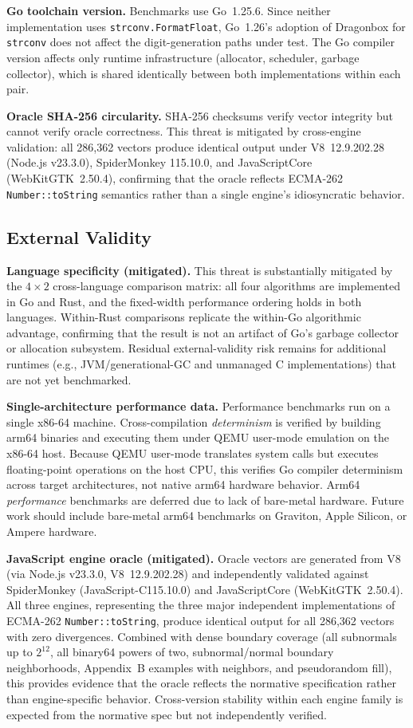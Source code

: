 \textbf{Go toolchain version.}
Benchmarks use Go~1.25.6.  Since neither implementation uses
\texttt{strconv.FormatFloat}, Go~1.26's adoption of Dragonbox for
\texttt{strconv} does not affect the digit-generation paths under test.
The Go compiler version affects only runtime infrastructure (allocator,
scheduler, garbage collector), which is shared identically between
both implementations within each pair.

\textbf{Oracle SHA-256 circularity.}
SHA-256 checksums verify vector integrity but cannot verify oracle
correctness.  This threat is mitigated by cross-engine validation:
all 286{,}362 vectors produce identical output under V8~12.9.202.28
(Node.js v23.3.0), SpiderMonkey 115.10.0, and JavaScriptCore
(WebKitGTK~2.50.4), confirming that the oracle reflects ECMA-262
\texttt{Number::toString} semantics rather than a single engine's
idiosyncratic behavior.

\subsection{External Validity}

\textbf{Language specificity (mitigated).}
This threat is substantially mitigated by the $4 \times 2$
cross-language comparison matrix: all four algorithms are implemented in
Go and Rust, and the fixed-width performance ordering holds in both
languages.  Within-Rust
comparisons replicate the within-Go algorithmic advantage, confirming
that the result is not an artifact of Go's garbage collector or
allocation subsystem.  Residual external-validity risk remains for
additional runtimes (e.g., JVM/generational-GC and unmanaged C
implementations) that are not yet benchmarked.

\textbf{Single-architecture performance data.}
Performance benchmarks run on a single x86-64 machine.
Cross-compilation \emph{determinism} is verified by building arm64
binaries and executing them under QEMU user-mode emulation on the x86-64
host.  Because QEMU user-mode translates system calls but executes
floating-point operations on the host CPU, this verifies Go compiler
determinism across target architectures, not native arm64 hardware
behavior.  Arm64 \emph{performance} benchmarks are deferred due to lack
of bare-metal hardware.  Future work should include bare-metal arm64
benchmarks on Graviton, Apple Silicon, or Ampere hardware.

\textbf{JavaScript engine oracle (mitigated).}
Oracle vectors are generated from V8 (via Node.js v23.3.0,
V8~12.9.202.28) and independently validated against SpiderMonkey
(JavaScript-C115.10.0) and JavaScriptCore (WebKitGTK~2.50.4).  All
three engines, representing the three major independent implementations
of ECMA-262 \texttt{Number::toString}, produce identical output for
all 286{,}362 vectors with zero divergences.  Combined with dense
boundary coverage (all subnormals up to $2^{12}$, all binary64 powers
of two, subnormal/normal boundary neighborhoods, \rfcjcs Appendix~B
examples with neighbors, and pseudorandom fill), this provides
evidence that the oracle reflects the normative specification rather
than engine-specific behavior.  Cross-version stability within each
engine family is expected from the normative spec but not independently
verified.

